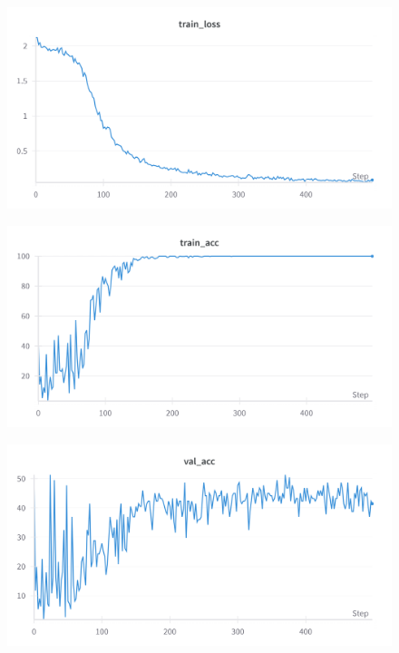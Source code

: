 \documentclass{article}
\begin{document}
\begin{figure}[t]
    \centering

    \begin{minipage}{0.6\textwidth}
        \centering
        \includegraphics[width=\textwidth]{Images/cnn3_train_loss.png}
        \label{fig:cnn3_train_loss}
    \end{minipage}

    \vspace*{0.4cm}

    \begin{minipage}{0.6\textwidth}
        \centering
        \includegraphics[width=\textwidth]{Images/cnn3_train_acc.png}
        \label{fig:cnn3_train_acc}
    \end{minipage}

    \vspace*{0.4cm}

    \begin{minipage}{0.6\textwidth}
        \centering
        \includegraphics[width=\textwidth]{Images/cnn3_val_acc.png}
        \label{fig:cnn3_val_acc}
    \end{minipage}


\end{figure}
\end{document}
